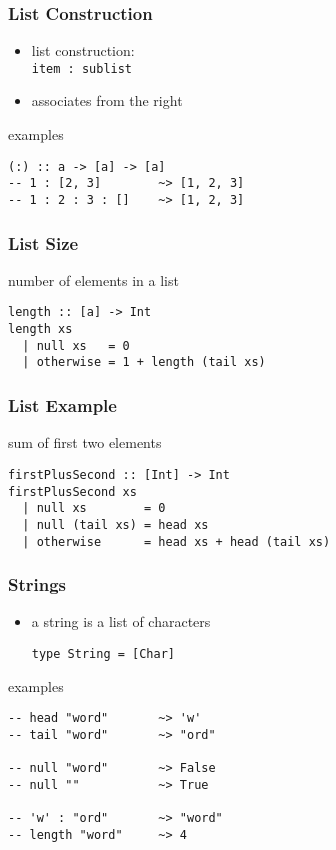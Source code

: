 \documentclass[dvipsnames]{beamer}
\theoremstyle{plain}
\begin{document}
\begin{frame}[fragile]
  \frametitle{List Construction}

  \begin{itemize}
    \item list construction:\\
      \lstinline|item : sublist|
    \item associates from the right
  \end{itemize}

  \pause
  \begin{exampleblock}{examples}
    \begin{lstlisting}
(:) :: a -> [a] -> [a]
-- 1 : [2, 3]        ~> [1, 2, 3]
-- 1 : 2 : 3 : []    ~> [1, 2, 3]
    \end{lstlisting}
  \end{exampleblock}
\end{frame}

\begin{frame}[fragile]
  \frametitle{List Size}

  \begin{exampleblock}{number of elements in a list}
    \begin{lstlisting}[deletekeywords={length}]
length :: [a] -> Int
length xs
  | null xs   = 0
  | otherwise = 1 + length (tail xs)
    \end{lstlisting}
  \end{exampleblock}
\end{frame}

\begin{frame}[fragile]
  \frametitle{List Example}

  \begin{exampleblock}{sum of first two elements}
    \begin{lstlisting}
firstPlusSecond :: [Int] -> Int
firstPlusSecond xs
  | null xs        = 0
  | null (tail xs) = head xs
  | otherwise      = head xs + head (tail xs)
    \end{lstlisting}
  \end{exampleblock}
\end{frame}

\begin{frame}[fragile]
  \frametitle{Strings}

  \begin{itemize}
   \item a string is a list of characters
    \begin{lstlisting}
type String = [Char]
    \end{lstlisting}
  \end{itemize}

  \begin{exampleblock}{examples}
    \begin{lstlisting}
-- head "word"       ~> 'w'
-- tail "word"       ~> "ord"

-- null "word"       ~> False
-- null ""           ~> True

-- 'w' : "ord"       ~> "word"
-- length "word"     ~> 4
    \end{lstlisting}
  \end{exampleblock}
\end{frame}
\end{document}
